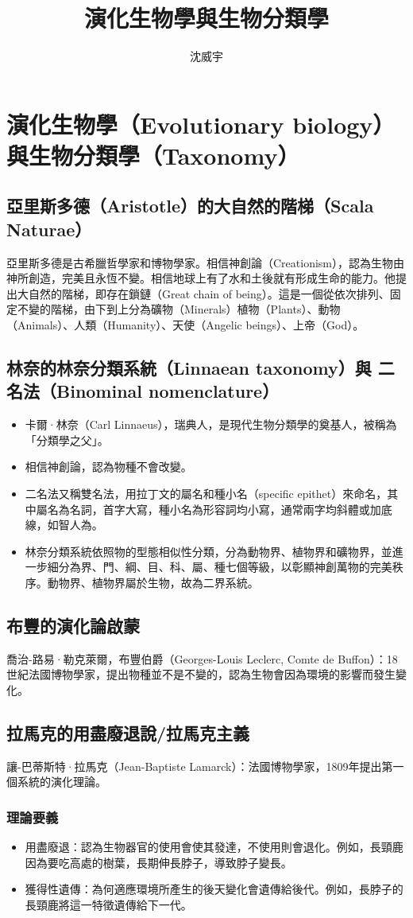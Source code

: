 \documentclass[a4paper,12pt]{report}
\begin{document}
\title{演化生物學與生物分類學}
\author{沈威宇}
\date{\temtoday}
\titletocdoc
\chapter{演化生物學（Evolutionary biology）與生物分類學（Taxonomy）}
\section{亞里斯多德（Aristotle）的大自然的階梯（Scala Naturae）}
亞里斯多德是古希臘哲學家和博物學家。相信神創論（Creationism），認為生物由神所創造，完美且永恆不變。相信地球上有了水和土後就有形成生命的能力。他提出大自然的階梯，即存在鎖鏈（Great chain of being）。這是一個從依次排列、固定不變的階梯，由下到上分為礦物（Minerals）植物（Plants）、動物（Animals）、人類（Humanity）、天使（Angelic beings）、上帝（God）。
\section{林奈的林奈分類系統（Linnaean taxonomy）與
二名法（Binominal nomenclature）}
\begin{itemize}
\item 卡爾·林奈（Carl Linnaeus），瑞典人，是現代生物分類學的奠基人，被稱為「分類學之父」。
\item 相信神創論，認為物種不會改變。
\item 二名法又稱雙名法，用拉丁文的屬名和種小名（specific epithet）來命名，其中屬名為名詞，首字大寫，種小名為形容詞均小寫，通常兩字均斜體或加底線，如智人為。
\item 林奈分類系統依照物的型態相似性分類，分為動物界、植物界和礦物界，並進一步細分為界、門、綱、目、科、屬、種七個等級，以彰顯神創萬物的完美秩序。動物界、植物界屬於生物，故為二界系統。
\end{itemize}
\section{布豐的演化論啟蒙}
喬治-路易·勒克萊爾，布豐伯爵（Georges-Louis Leclerc, Comte de Buffon）：18世紀法國博物學家，提出物種並不是不變的，認為生物會因為環境的影響而發生變化。
\section{拉馬克的用盡廢退說/拉馬克主義}
讓-巴蒂斯特·拉馬克（Jean-Baptiste Lamarck）：法國博物學家，1809年提出第一個系統的演化理論。
\subsection{理論要義}
\begin{itemize}
\item 用盡廢退：認為生物器官的使用會使其發達，不使用則會退化。例如，長頸鹿因為要吃高處的樹葉，長期伸長脖子，導致脖子變長。
\item 獲得性遺傳：為何適應環境所產生的後天變化會遺傳給後代。例如，長脖子的長頸鹿將這一特徵遺傳給下一代。
\end{itemize}
\end{document}
